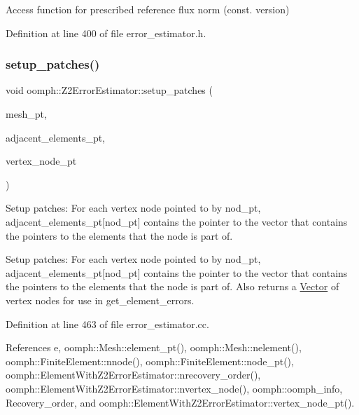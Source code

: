 Access function for prescribed reference flux norm (const. version) 



Definition at line 400 of file error\+\_\+estimator.\+h.

\mbox{\label{classoomph_1_1Z2ErrorEstimator_a7d00059cd1a8d61bbfc59788b1d12905}} 
\subsubsection{\texorpdfstring{setup\+\_\+patches()}{setup\_patches()}}
{\footnotesize\ttfamily void oomph\+::\+Z2\+Error\+Estimator\+::setup\+\_\+patches (\begin{DoxyParamCaption}\item[{\hyperlink{classoomph_1_1Mesh}{Mesh} $\ast$\&}]{mesh\+\_\+pt,  }\item[{std\+::map$<$ \hyperlink{classoomph_1_1Node}{Node} $\ast$, \hyperlink{classoomph_1_1Vector}{Vector}$<$ \hyperlink{classoomph_1_1ElementWithZ2ErrorEstimator}{Element\+With\+Z2\+Error\+Estimator} $\ast$$>$ $\ast$$>$ \&}]{adjacent\+\_\+elements\+\_\+pt,  }\item[{\hyperlink{classoomph_1_1Vector}{Vector}$<$ \hyperlink{classoomph_1_1Node}{Node} $\ast$$>$ \&}]{vertex\+\_\+node\+\_\+pt }\end{DoxyParamCaption})}



Setup patches\+: For each vertex node pointed to by nod\+\_\+pt, adjacent\+\_\+elements\+\_\+pt\mbox{[}nod\+\_\+pt\mbox{]} contains the pointer to the vector that contains the pointers to the elements that the node is part of. 

Setup patches\+: For each vertex node pointed to by nod\+\_\+pt, adjacent\+\_\+elements\+\_\+pt\mbox{[}nod\+\_\+pt\mbox{]} contains the pointer to the vector that contains the pointers to the elements that the node is part of. Also returns a \hyperlink{classoomph_1_1Vector}{Vector} of vertex nodes for use in get\+\_\+element\+\_\+errors. 

Definition at line 463 of file error\+\_\+estimator.\+cc.



References e, oomph\+::\+Mesh\+::element\+\_\+pt(), oomph\+::\+Mesh\+::nelement(), oomph\+::\+Finite\+Element\+::nnode(), oomph\+::\+Finite\+Element\+::node\+\_\+pt(), oomph\+::\+Element\+With\+Z2\+Error\+Estimator\+::nrecovery\+\_\+order(), oomph\+::\+Element\+With\+Z2\+Error\+Estimator\+::nvertex\+\_\+node(), oomph\+::oomph\+\_\+info, Recovery\+\_\+order, and oomph\+::\+Element\+With\+Z2\+Error\+Estimator\+::vertex\+\_\+node\+\_\+pt().



